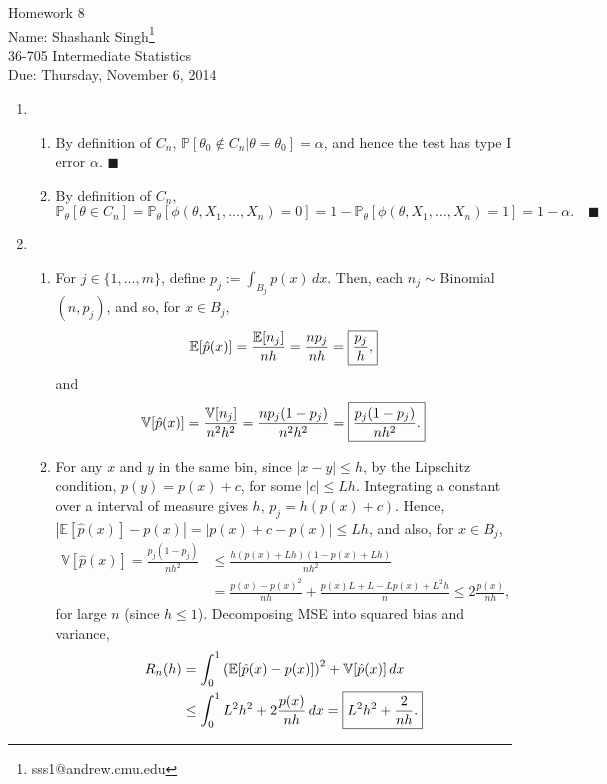 \documentclass[11pt]{article}
\makeatletter
\newcommand{\myname}{Shashank Singh\footnote{sss1@andrew.cmu.edu}}
\newcommand{\myclass}{36-705 Intermediate Statistics}
\newcommand{\myhwnum}{8}
\newcommand{\duedate}{Thursday, November 6, 2014}
\renewcommand{\qed}{\quad \ensuremath{\blacksquare}}
\newcommand{\E}{\mathbb{E}} %
\newcommand{\pr}{\mathbb{P}} %
\newcommand{\Var}{\mathbb{V}} %
\renewcommand{\P}{\mathbb{P}}   %
\makeatother
\begin{document}
\thispagestyle{plain}

{\Large Homework \myhwnum} \\
Name: \myname \\
\myclass \\
Due: \duedate

\begin{enumerate}
\item
\begin{enumerate}
\item By definition of $C_n$,
$\P[ \theta_0 \notin C_n | \theta = \theta_0] = \alpha$, and hence the test has
type I error $\alpha$. \qed
\item By definition of $C_n$,
\[\pr_\theta[\theta \in C_n]
    = \pr_\theta[\phi(\theta,X_1,\dots,X_n) = 0]
    = 1 - \pr_\theta[\phi(\theta,X_1,\dots,X_n) = 1]
    = 1 - \alpha. \qed
\]
\end{enumerate}
\item
\begin{enumerate}
\item For $j \in \{1,\dots,m\}$, define $p_j := \int_{B_j} p(x) \, dx$.
Then, each $n_j \sim$Binomial$(n,p_j)$, and so, for $x \in B_j$,
\[\E[\hat p(x)]
    = \frac{\E[n_j]}{nh}
    = \frac{np_j}{nh}
    = \mbox{\fbox{$\displaystyle \frac{p_j}{h}$,}}
\]
and
\[\Var[\hat p(x)]
    = \frac{\Var[n_j]}{n^2h^2}
    = \frac{np_j(1 - p_j)}{n^2h^2}
    = \mbox{\fbox{$\displaystyle \frac{p_j(1 - p_j)}{nh^2}$.}}
\]
\item For any $x$ and $y$ in the same bin, since $|x - y| \leq h$, by the
Lipschitz condition, $p(y) = p(x) + c$, for some $|c| \leq Lh$. Integrating a
constant over a interval of measure gives $h$, $p_j = h(p(x) + c)$.
Hence, $|\E[\hat p(x)] - p(x)| = |p(x) + c - p(x)| \leq Lh$, and also, for
$x \in B_j$, 
\begin{align*}
\Var[\hat p(x)]
    = \frac{p_j(1 - p_j)}{nh^2}
 &  \leq \frac{h(p(x) + Lh)(1 - p(x) + Lh)}{nh^2} \\
 &  = \frac{p(x) - p(x)^2}{nh} + \frac{p(x)L + L - Lp(x) + L^2h}{n}
    \leq 2\frac{p(x)}{nh},
\end{align*}
for large $n$ (since $h \leq 1$). Decomposing MSE into squared bias and
variance,
\begin{align}
\notag
R_n(h)
 &  = \int_0^1 \left( \E[\hat p(x) - p(x)] \right)^2 + \Var[\hat p(x)] \, dx \\
\label{ineq:risk_bnd}
 &  \leq \int_0^1 L^2h^2 + 2\frac{p(x)}{nh} \, dx
    = \mbox{\fbox{$\displaystyle L^2h^2 + \frac{2}{nh}$.}}
\end{align}

\end{enumerate}
\end{enumerate}
\end{document}

